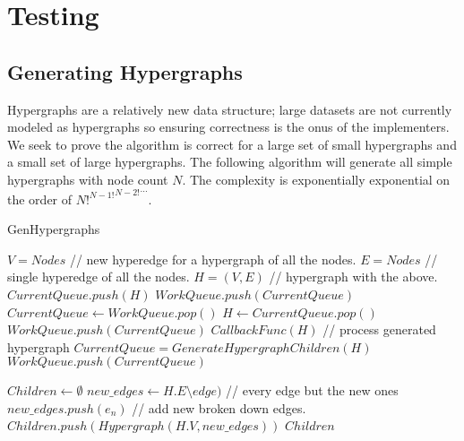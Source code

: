 
\chapter{Testing}

\section{Generating Hypergraphs}
Hypergraphs are a relatively new data structure; large datasets are not currently modeled as hypergraphs so ensuring correctness is the onus of the implementers. We seek to prove the algorithm is correct for a large set of small hypergraphs and a small set of large hypergraphs. The following algorithm will generate all simple hypergraphs with node count $N$. The complexity is exponentially exponential on the order of ${{{N!}^{N-1!}}^{N-2!}}^{...}$. 
\begin{algorithm}
	\caption{GenHypergraphs}\label{GenHypergraphs}
	\begin{algorithmic}[1]
		\State $V = {Nodes}$ // new hyperedge for a hypergraph of all the nodes.
		\State $E = {Nodes}$ // single hyperedge of all the nodes.
		\State $H = (V,E)$ // hypergraph with the above.
		\State $CurrentQueue.push(H)$ 
		\State $WorkQueue.push(CurrentQueue)$
		\State $CurrentQueue \gets WorkQueue.pop()$
		\State $H \gets CurrentQueue.pop()$
		\State  $WorkQueue.push(CurrentQueue)$
		\EndIf
		\State $CallbackFunc(H)$ // process generated hypergraph
		\State $CurrentQueue = GenerateHypergraphChildren(H)$
		\State  $WorkQueue.push(CurrentQueue)$
		\EndIf
		\EndWhile
		\EndFunction
	
		\State $Children \gets \emptyset$
		\State $new\_edges \gets H.E \setminus edge)$ // every edge but the new ones
		\State $new\_edges.push(e_n)$ // add new broken down edges.
		\EndFor 
		\State $Children.push(Hypergraph(H.V,new\_edges))$
		\EndFor
		\State \Return $Children$
		\EndFor
		\EndFunction
	\end{algorithmic}
\end{algorithm}
